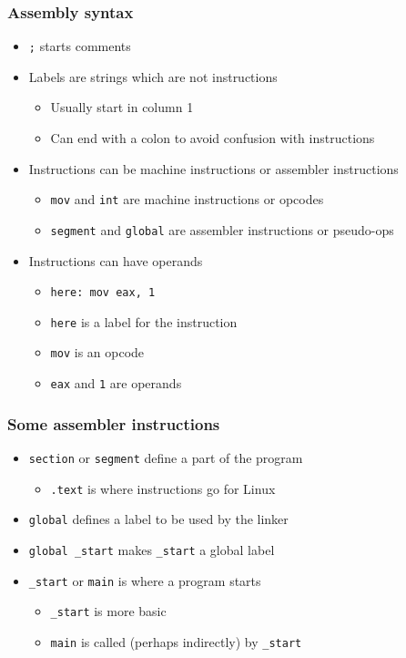 \documentclass{beamer}
\begin{document}
\begin{frame}
    \frametitle{Assembly syntax}
    \begin{itemize}
        \item {\tt ;} starts comments
        \item Labels are strings which are not instructions
        \begin{itemize}
            \item Usually start in column 1
            \item Can end with a colon to avoid confusion with instructions
        \end{itemize}
        \item Instructions can be machine instructions or assembler instructions
        \begin{itemize}
            \item {\tt mov} and {\tt int} are machine instructions or opcodes
            \item {\tt segment} and {\tt global} are assembler instructions
                  or pseudo-ops
        \end{itemize}
        \item Instructions can have operands
        \begin{itemize}
            \item {\tt here:  mov  eax, 1}
            \item {\tt here} is a label for the instruction
            \item {\tt mov} is an opcode
            \item {\tt eax} and {\tt 1} are operands
        \end{itemize}
    \end{itemize}
\end{frame}

\begin{frame}
    \frametitle{Some assembler instructions}
    \begin{itemize}
        \item {\tt section} or {\tt segment} define a part of the program
        \begin{itemize}
            \item {\tt .text} is where instructions go for Linux
        \end{itemize}
        \item {\tt global} defines a label to be used by the linker
        \item {\tt global \_start} makes {\tt \_start} a global label
        \item {\tt \_start} or {\tt main} is where a program starts
        \begin{itemize}
            \item {\tt \_start} is more basic
            \item {\tt main} is called (perhaps indirectly) by {\tt \_start}
        \end{itemize}
    \end{itemize}
\end{frame}
\end{document}
